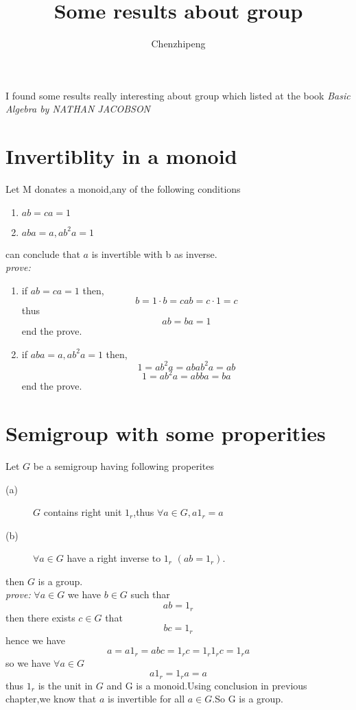 \documentclass[a4paper,12pt]{article}
\author{Chenzhipeng}
\title{Some results about group}
\begin{document}
\maketitle
I found some results really interesting about group which listed at the book \textit{Basic Algebra by NATHAN JACOBSON}

\section{Invertiblity in a monoid}
Let M donates a monoid,any of the following conditions
\begin{enumerate}
\item
$ ab=ca=1 $
\item
$aba = a, ab^2a = 1$
\end{enumerate}
can conclude that $a$ is invertible with b as inverse.\\
\textit{prove:}
\begin{enumerate}
\item
if $ ab=ca=1 $ then,
\[ b = 1 \cdot b = cab = c \cdot 1 = c \]
thus 
\[ ab=ba=1 \]
end the prove.
\item
if $aba = a, ab^2a = 1$ then,
\[ 1 = ab^2a = abab^2a = ab \]
\[ 1 = ab^2a = abba = ba \]
end the prove.
\end{enumerate}

\section{Semigroup with some properities}

Let $G$ be a semigroup having following properites 
\begin{description}
\item[(a)]
$G$ contains right unit $1_r$,thus $\forall a \in G, a1_r=a$ \\
\item[(b)]
$\forall a \in G$ have a right inverse to $1_r$ $(ab=1_r)$. \\
\end{description}
then $G$ is a group.\\
\textit{prove:} 
$\forall a \in G$ we have $b \in G$ such thar 
\[ ab = 1_r \]
then there exists $c \in G$ that
\[ bc = 1_r \]
hence we have
\[ a = a 1_r = abc = 1_r c = 1_r 1_r c = 1_r a \]
so we have $\forall a \in G$
\[ a 1_r = 1_r a = a \]
thus $1_r$ is the unit in $G$ and G is a monoid.Using conclusion in previous chapter,we know that $a$ is invertible for all $a \in G$.So G is a group.
\end{document}
